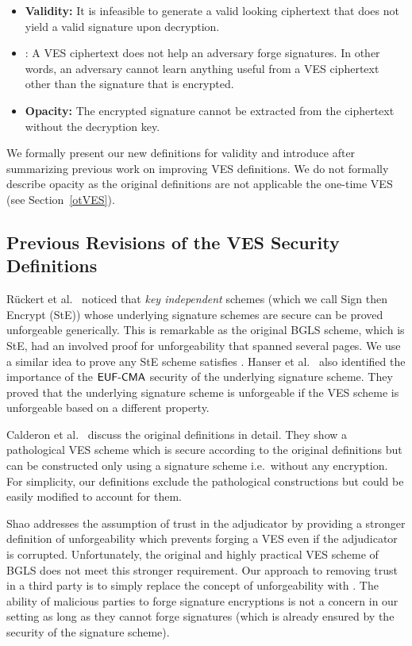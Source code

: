\begin{itemize}
    \item \textbf{Validity:} It is infeasible to generate a valid looking ciphertext that does not yield a valid signature upon decryption.
    \item \EUFCMAVES: A VES ciphertext does not help an adversary forge signatures. In other words, an adversary cannot learn anything useful from a VES ciphertext other than the signature that is encrypted.
    \item \textbf{Opacity:} The encrypted signature cannot be extracted from the ciphertext without the decryption key.
\end{itemize}


We formally present our new definitions for validity and introduce \EUFCMAVES after summarizing previous work on improving VES definitions. We do not formally describe opacity as the original definitions are not applicable the one-time VES (see Section~\ref{otVES}).

\subsection{Previous Revisions of the VES Security Definitions}

Rückert et al.\ \cite{Ruckert:2009:SVE:1615384.1615387} noticed that \emph{key independent} schemes (which we call Sign then Encrypt (StE)) whose underlying signature schemes are \EUFCMA secure can be proved unforgeable generically.
This is remarkable as the original BGLS scheme, which is StE, had an involved proof for unforgeability that spanned several pages.
We use a similar idea to prove any StE scheme satisfies \EUFCMAVES\@. Hanser et al.\ \cite{VES-structure-preserving} also identified the importance of the $\textsf{EUF-CMA}$ security of the underlying signature scheme. They proved that the underlying signature scheme is unforgeable if the VES scheme is unforgeable based on a different property.

Calderon et al.\ \cite{calderon2014rethinking} discuss the original definitions in detail.
They show a pathological VES scheme which is secure according to the original definitions but can be constructed only using a signature scheme i.e.\ without any encryption.
For simplicity, our definitions exclude the pathological constructions but could be easily modified to account for them.

Shao \cite{SHAO20081961} addresses the assumption of trust in the adjudicator by providing a stronger definition of unforgeability which prevents forging a VES even if the adjudicator is corrupted.
Unfortunately, the original and highly practical VES scheme of BGLS does not meet this stronger requirement.
Our approach to removing trust in a third party is to simply replace the concept of unforgeability with \EUFCMAVES\@.
The ability of malicious parties to forge signature encryptions is not a concern in our setting as long as they cannot forge signatures (which is already ensured by the \EUFCMA security of the signature scheme).

